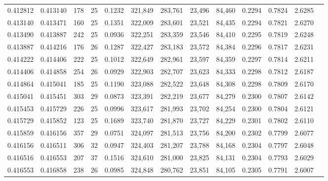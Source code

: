 \begin{tabular}{rrrrrrrrrrrrr}
0.412812 & 0.413140 &   178 &  25 &                                     0.1232 & 321,849 & 283,761 &  23,496 &  84,460 & 0.2294 & 0.7824 & 2.6285 \\
0.413140 & 0.413471 &   160 &  25 &                                     0.1351 & 322,009 & 283,601 &  23,521 &  84,435 & 0.2294 & 0.7821 & 2.6270 \\
0.413490 & 0.413887 &   242 &  25 &                                     0.0936 & 322,251 & 283,359 &  23,546 &  84,410 & 0.2295 & 0.7819 & 2.6248 \\
0.413887 & 0.414216 &   176 &  26 &                                     0.1287 & 322,427 & 283,183 &  23,572 &  84,384 & 0.2296 & 0.7817 & 2.6231 \\
0.414222 & 0.414406 &   222 &  25 &                                     0.1012 & 322,649 & 282,961 &  23,597 &  84,359 & 0.2297 & 0.7814 & 2.6211 \\
0.414406 & 0.414858 &   254 &  26 &                                     0.0929 & 322,903 & 282,707 &  23,623 &  84,333 & 0.2298 & 0.7812 & 2.6187 \\
0.414864 & 0.415041 &   185 &  25 &                                     0.1190 & 323,088 & 282,522 &  23,648 &  84,308 & 0.2298 & 0.7809 & 2.6170 \\
0.415041 & 0.415451 &   303 &  29 &                                     0.0873 & 323,391 & 282,219 &  23,677 &  84,279 & 0.2300 & 0.7807 & 2.6142 \\
0.415453 & 0.415729 &   226 &  25 &                                     0.0996 & 323,617 & 281,993 &  23,702 &  84,254 & 0.2300 & 0.7804 & 2.6121 \\
0.415729 & 0.415852 &   123 &  25 &                                     0.1689 & 323,740 & 281,870 &  23,727 &  84,229 & 0.2301 & 0.7802 & 2.6110 \\
0.415859 & 0.416156 &   357 &  29 &                                     0.0751 & 324,097 & 281,513 &  23,756 &  84,200 & 0.2302 & 0.7799 & 2.6077 \\
0.416156 & 0.416511 &   306 &  32 &                                     0.0947 & 324,403 & 281,207 &  23,788 &  84,168 & 0.2304 & 0.7797 & 2.6048 \\
0.416516 & 0.416553 &   207 &  37 &                                     0.1516 & 324,610 & 281,000 &  23,825 &  84,131 & 0.2304 & 0.7793 & 2.6029 \\
0.416553 & 0.416858 &   238 &  26 &                                     0.0985 & 324,848 & 280,762 &  23,851 &  84,105 & 0.2305 & 0.7791 & 2.6007 \\

\end{tabular}
